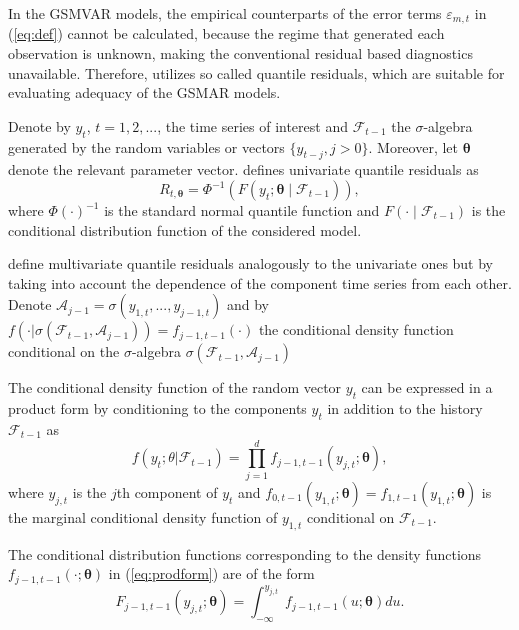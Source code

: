 \documentclass[nojss]{jss}
\begin{document}
In the GSMVAR models, the empirical counterparts of the error terms $\varepsilon_{m,t}$ in (\ref{eq:def}) cannot be calculated, because the regime that generated each observation is unknown, making the conventional residual based diagnostics unavailable. Therefore,  utilizes so called quantile residuals, which are suitable for evaluating adequacy of the GSMAR models.

Denote by $y_t$, $t=1,2,...$,  the time series of interest and $\mathcal{F}_{t-1}$ the $\sigma$-algebra generated by the random variables or vectors $\lbrace y_{t-j}, j > 0 \rbrace$.  Moreover, let $\boldsymbol{\theta}$ denote the relevant parameter vector. \cite{Kalliovirta:2012} defines univariate quantile residuals as
\begin{equation}
R_{t,\boldsymbol{\theta}}=\Phi^{-1}(F(y_t;\boldsymbol{\theta}\mid \mathcal{F}_{t-1})),
\end{equation}
where $\Phi(\cdot)^{-1}$ is the standard normal quantile function and $F(\cdot\mid \mathcal{F}_{t-1})$ is the conditional distribution function of the considered model.

\cite{Kalliovirta+Saikkonen:2010} define multivariate quantile residuals analogously to the univariate ones but by taking into account the dependence of the component time series from each other.  Denote $\mathcal{A}_{j-1}=\sigma(y_{1,t},...,y_{j-1,t})$ and by $f(\cdot|\sigma(\mathcal{F}_{t-1},\mathcal{A}_{j-1}))=f_{j-1,t-1}(\cdot)$ the conditional density function conditional on the $\sigma$-algebra $\sigma(\mathcal{F}_{t-1},\mathcal{A}_{j-1})$

The conditional density function of the random vector $y_t$ can be expressed in a product form by conditioning to the components $y_t$ in addition to the history $\mathcal{F}_{t-1}$ as
\begin{equation}\label{eq:prodform}
f(y_t;\theta|\mathcal{F}_{t-1})=\prod_{j=1}^{d}f_{j-1,t-1}(y_{j,t};\boldsymbol{\theta}),
\end{equation}
where $y_{j,t}$ is the $j$th component of $y_t$ and $f_{0,t-1}(y_{1,t};\boldsymbol{\theta})=f_{1,t-1}(y_{1,t};\boldsymbol{\theta})$ is the marginal conditional density function of $y_{1,t}$ conditional on $\mathcal{F}_{t-1}$.

The conditional distribution functions corresponding to the density functions $f_{j-1,t-1}(\cdot;\boldsymbol{\theta})$ in (\ref{eq:prodform}) are of the form
\begin{equation}
F_{j-1,t-1}(y_{j,t};\boldsymbol{\theta})=\int_{-\infty}^{y_{j,t}} f_{j-1,t-1}(u;\boldsymbol{\theta})du.
\end{equation}
\end{document}
